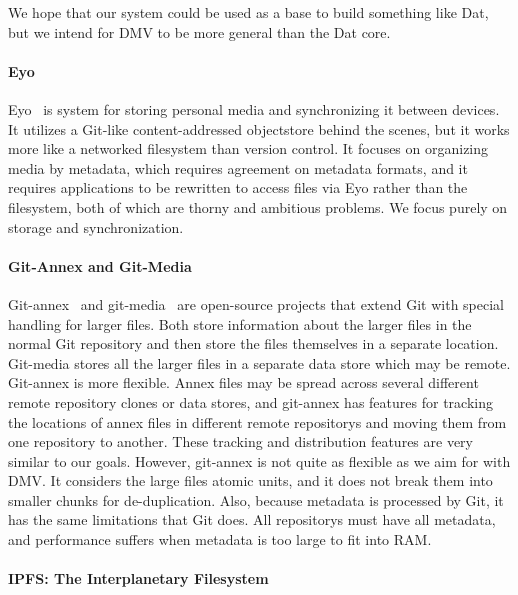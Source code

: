 We hope that our system could be used as a base to build something like Dat, but
we intend for \gls{DMV} to be more general than the Dat core.


\paragraph{Eyo}

Eyo~\cite{Strauss:2011:EDP:2002181.2002216} is system for storing personal media
and synchronizing it between devices. It utilizes a Git-like content-addressed
\gls{objectstore} behind the scenes, but it works more like a networked filesystem
than version control. It focuses on organizing media by metadata, which requires
agreement on metadata formats, and it requires applications to be rewritten to
access files via Eyo rather than the filesystem, both of which are thorny and
ambitious problems. We focus purely on storage and synchronization.


\paragraph{Git-Annex and Git-Media}

Git-annex~\cite{git_annex_homepage} and git-media~\cite{git_media_github} are
open-source projects that extend Git with special handling for larger files.
Both store information about the larger files in the normal Git \gls{repository}
and then store the files themselves in a separate location. Git-media stores all
the larger files in a separate data store which may be remote. Git-annex is more
flexible. Annex files may be spread across several different remote
\gls{repository} clones or data stores, and git-annex has features for tracking
the locations of annex files in different remote \glspl{repository} and moving
them from one \gls{repository} to another. These tracking and distribution
features are very similar to our goals. However, git-annex is not quite as
flexible as we aim for with \gls{DMV}. It considers the large files atomic
units, and it does not break them into smaller chunks for de-duplication. Also,
because metadata is processed by Git, it has the same limitations that Git does.
All \glspl{repository} must have all metadata, and performance suffers when
metadata is too large to fit into RAM.


\paragraph{IPFS: The Interplanetary Filesystem}

